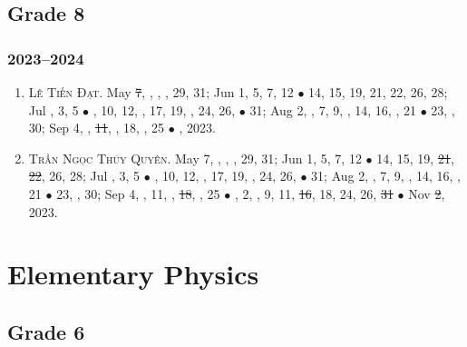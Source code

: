 \documentclass{article}
\begin{document}
\subsection{Grade 8}

\subsubsection{2023--2024}

\begin{enumerate}
	\item \textsc{Lê Tiến Đạt.} May \st{7}, , , , 29, 31; Jun 1, 5, 7, 12 $\bullet$ 14, 15, 19, 21, 22, 26, 28; Jul , 3, 5 $\bullet$ , 10, 12, , 17, 19, , 24, 26,  $\bullet$ 31; Aug 2, , 7, 9, , 14, 16, , 21 $\bullet$ 23, , 30; Sep 4, , \st{11}, , 18, , 25 $\bullet$ , 2023. {\sf[Out]}
	\item \textsc{Trần Ngọc Thúy Quyên.} May 7, , , , 29, 31; Jun 1, 5, 7, 12 $\bullet$ 14, 15, 19, \st{21}, \st{22}, 26, 28; Jul , 3, 5 $\bullet$ , 10, 12, , 17, 19, , 24, 26,  $\bullet$ 31; Aug 2, , 7, 9, , 14, 16, , 21 $\bullet$ 23, , 30; Sep 4, , 11, , \st{18}, , 25 $\bullet$ , 2, , 9, 11, \st{16}, 18, 24, 26, \st{31} $\bullet$ Nov \st{2}, 2023.
\end{enumerate}


\section{Elementary Physics}

\subsection{Grade 6}
\end{document}
